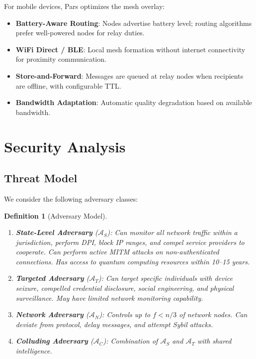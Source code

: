 \documentclass[11pt,a4paper,twocolumn]{article}
\newtheorem{definition}[theorem]{Definition}
\begin{document}
For mobile devices, Pars optimizes the mesh overlay:

\begin{itemize}[leftmargin=*]
  \item \textbf{Battery-Aware Routing}: Nodes advertise battery level; routing algorithms prefer well-powered nodes for relay duties.
  \item \textbf{WiFi Direct / BLE}: Local mesh formation without internet connectivity for proximity communication.
  \item \textbf{Store-and-Forward}: Messages are queued at relay nodes when recipients are offline, with configurable TTL.
  \item \textbf{Bandwidth Adaptation}: Automatic quality degradation based on available bandwidth.
\end{itemize}

\section{Security Analysis}
\label{sec:security}

\subsection{Threat Model}

We consider the following adversary classes:

\begin{definition}[Adversary Model]
\begin{enumerate}
  \item \textbf{State-Level Adversary} ($\mathcal{A}_S$): Can monitor all network traffic within a jurisdiction, perform DPI, block IP ranges, and compel service providers to cooperate. Can perform active MITM attacks on non-authenticated connections. Has access to quantum computing resources within 10--15 years.
  \item \textbf{Targeted Adversary} ($\mathcal{A}_T$): Can target specific individuals with device seizure, compelled credential disclosure, social engineering, and physical surveillance. May have limited network monitoring capability.
  \item \textbf{Network Adversary} ($\mathcal{A}_N$): Controls up to $f < n/3$ of network nodes. Can deviate from protocol, delay messages, and attempt Sybil attacks.
  \item \textbf{Colluding Adversary} ($\mathcal{A}_C$): Combination of $\mathcal{A}_S$ and $\mathcal{A}_T$ with shared intelligence.
\end{enumerate}
\end{definition}
\end{document}
